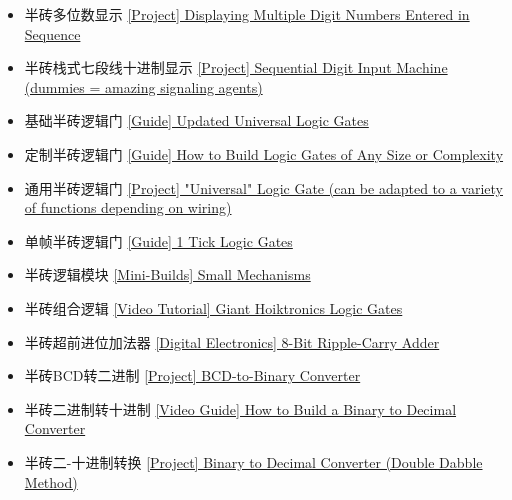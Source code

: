 \begin{itemize}
\item 半砖多位数显示 \href{https://forums.terraria.org/index.php?threads/project-displaying-multiple-digit-numbers-entered-in-sequence.75935/}{[Project] Displaying Multiple Digit Numbers Entered in Sequence}
\item 半砖栈式七段线十进制显示 \href{https://forums.terraria.org/index.php?threads/project-sequential-digit-input-machine-dummies-amazing-signaling-agents.75909/}{[Project] Sequential Digit Input Machine (dummies = amazing signaling agents)}
\item 基础半砖逻辑门 \href{https://forums.terraria.org/index.php?threads/guide-updated-universal-logic-gates.75913/}{[Guide] Updated Universal Logic Gates}
\item 定制半砖逻辑门 \href{https://forums.terraria.org/index.php?threads/guide-how-to-build-logic-gates-of-any-size-or-complexity.75911/}{[Guide] How to Build Logic Gates of Any Size or Complexity}
\item 通用半砖逻辑门 \href{https://forums.terraria.org/index.php?threads/project-universal-logic-gate-can-be-adapted-to-a-variety-of-functions-depending-on-wiring.75898/}{[Project] "Universal" Logic Gate (can be adapted to a variety of functions depending on wiring)}
\item 单帧半砖逻辑门 \href{https://forums.terraria.org/index.php?threads/guide-1-tick-logic-gates.77001/}{[Guide] 1 Tick Logic Gates}
\item 半砖逻辑模块 \href{https://forums.terraria.org/index.php?threads/mini-builds-small-mechanisms.76983/}{[Mini-Builds] Small Mechanisms}
\item 半砖组合逻辑 \href{https://forums.terraria.org/index.php?threads/video-tutorial-giant-hoiktronics-logic-gates.75904/}{[Video Tutorial] Giant Hoiktronics Logic Gates}
\item 半砖超前进位加法器 \href{https://forums.terraria.org/index.php?threads/digital-electronics-8-bit-ripple-carry-adder.77033/}{[Digital Electronics] 8-Bit Ripple-Carry Adder}
\item 半砖BCD转二进制 \href{https://forums.terraria.org/index.php?threads/project-bcd-to-binary-converter.75907/}{[Project] BCD-to-Binary Converter}
\item 半砖二进制转十进制 \href{https://forums.terraria.org/index.php?threads/video-guide-how-to-build-a-binary-to-decimal-converter.75926/}{[Video Guide] How to Build a Binary to Decimal Converter}
\item 半砖二-十进制转换 \href{https://forums.terraria.org/index.php?threads/project-binary-to-decimal-converter-double-dabble-method.75937/}{[Project] Binary to Decimal Converter (Double Dabble Method)}

\end{itemize}

